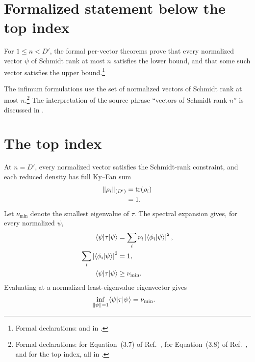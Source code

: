 \documentclass{article}
\begin{document}
\section{Formalized statement below the top index}

For $1\leq n<D'$, the formal per-vector theorems prove that every normalized
vector $\psi$ of Schmidt rank at most $n$ satisfies the lower bound, and that
some such vector satisfies the upper bound.\footnote{Formal declarations:
     and
     in
    .}

The infimum formulations use the set of normalized vectors of Schmidt rank at
most $n$.\footnote{Formal declarations:
     for
    Equation~(3.7) of Ref.~\cite{Wolf2012Quantum},
     for
    Equation~(3.8) of Ref.~\cite{Wolf2012Quantum}, and
     for the top
    index, all in
    .}
The interpretation of the source phrase ``vectors of Schmidt rank $n$'' is
discussed in
.

\section{The top index}

At $n=D'$, every normalized vector satisfies the Schmidt-rank constraint, and
each reduced density has full Ky--Fan sum
\begin{align}
    \lVert\rho_i\rVert_{(D')}
        &=\operatorname{tr}(\rho_i)
    \label{eq:wolf_prop_3_2_top_index_scope_ky_fan_trace}\\
        &=1.
    \label{eq:wolf_prop_3_2_top_index_scope_ky_fan_one}
\end{align}
Let $\nu_{\min}$ denote the smallest eigenvalue of $\tau$. The spectral
expansion gives, for every normalized $\psi$,
\begin{align}
    \langle \psi|\tau|\psi\rangle
        &=\sum_i\nu_i
            \left|\langle \phi_i | \psi \rangle\right|^2,
    \label{eq:wolf_prop_3_2_top_index_scope_rayleigh_expansion}\\
    \sum_i\left|\langle \phi_i | \psi \rangle\right|^2
        &=1,
    \label{eq:wolf_prop_3_2_top_index_scope_parseval}\\
    \langle \psi|\tau|\psi\rangle
        &\geq\nu_{\min}.
    \label{eq:wolf_prop_3_2_top_index_scope_rayleigh_lower_bound}
\end{align}
Evaluating at a normalized least-eigenvalue eigenvector gives
\begin{align}
    \inf_{\lVert\psi\rVert=1}\langle \psi|\tau|\psi\rangle
        &=\nu_{\min}.
    \label{eq:wolf_prop_3_2_top_index_scope_minimum_eigenvalue}
\end{align}
\end{document}
